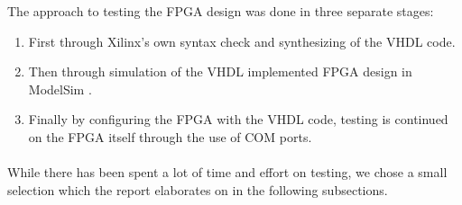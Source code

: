 The approach to testing the FPGA design was done in three separate stages:
\begin{enumerate}
	\item First through Xilinx's \cite{xilinx-ise} own syntax check and
synthesizing of the VHDL code.
	\item Then through simulation of the VHDL implemented FPGA design in
ModelSim \cite{modelsim}.
	\item Finally by configuring the FPGA with the VHDL code, testing is
continued on the FPGA itself through the use of COM ports.
\end{enumerate}
\paragraph*{}
While there has been spent a lot of time and effort on testing, we chose a small
selection which the report elaborates on in the following subsections.\newpage
